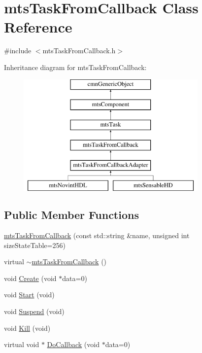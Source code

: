 \hypertarget{classmts_task_from_callback}{\section{mts\-Task\-From\-Callback Class Reference}
\label{classmts_task_from_callback}
}


{\ttfamily \#include $<$mts\-Task\-From\-Callback.\-h$>$}

Inheritance diagram for mts\-Task\-From\-Callback\-:\begin{figure}[H]
\begin{center}
\leavevmode
\includegraphics[height=6.000000cm]{d7/d02/classmts_task_from_callback}
\end{center}
\end{figure}
\subsection*{Public Member Functions}
\begin{DoxyCompactItemize}
\item 
\hyperlink{classmts_task_from_callback_a42fde8ba0b610a7dde8edc540f2ac05e}{mts\-Task\-From\-Callback} (const std\-::string \&name, unsigned int size\-State\-Table=256)
\item 
virtual \hyperlink{classmts_task_from_callback_a6af1292436c5c06029742818a7be0eea}{$\sim$mts\-Task\-From\-Callback} ()
\item 
void \hyperlink{classmts_task_from_callback_ad167ac4fc56eb5559af44741cbc10600}{Create} (void $\ast$data=0)
\item 
void \hyperlink{classmts_task_from_callback_a420e3a65a5cb0bcd5adad46964a49892}{Start} (void)
\item 
void \hyperlink{classmts_task_from_callback_af084a18079cb3bb5e63556222f626e06}{Suspend} (void)
\item 
void \hyperlink{classmts_task_from_callback_ae5a5080d14be6175588bc98275070384}{Kill} (void)
\item 
virtual void $\ast$ \hyperlink{classmts_task_from_callback_ab2a10cb9dc0365bc2df219d5b702d9fc}{Do\-Callback} (void $\ast$data=0)
\end{DoxyCompactItemize}
